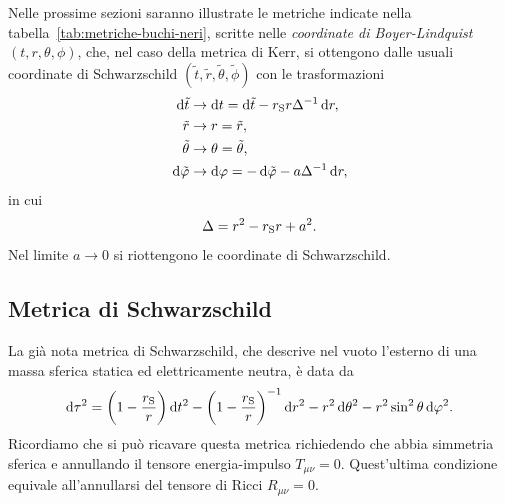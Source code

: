 Nelle prossime sezioni saranno illustrate le metriche indicate nella
tabella~\ref{tab:metriche-buchi-neri}, scritte nelle \emph{coordinate di
  Boyer-Lindquist} \((t, r, \theta,
\phi)\), che, nel caso della metrica di Kerr, si ottengono dalle usuali
coordinate di Schwarzschild \((\tilde{t}, \tilde{r}, \tilde{\theta},
\tilde{\phi})\) con le
trasformazioni~\parencites{1967JMP.....8..265B}{2007arXiv0706.0622V}
\begin{subequations}
  \begin{align}
    \dd\tilde{t}    & \to \dd t   = \dd\tilde{t} - r_{\textup{S}}r\Delta^{-1}
                      \dd r, \\
    \tilde{r}       & \to r       = \tilde{r},                           \\
    \tilde{\theta}  & \to \theta  = \tilde{\theta},                      \\
    \dd\tilde{\phi} & \to \dd\phi = -\dd\tilde{\phi} - a\Delta^{-1} \dd r,
  \end{align}
\end{subequations}
in cui
\begin{equation}
  \Delta = r^{2} - r_{\textup{S}}r + a^{2}.
\end{equation}
Nel limite \(a\to 0\) si riottengono le coordinate di Schwarzschild.

\subsection{Metrica di Schwarzschild}
\label{sec:metrica-schwarzschild-bh}

La già nota metrica di Schwarzschild, che descrive nel vuoto l'esterno di una
massa sferica statica ed elettricamente neutra, è data da
\begin{equation}
  \label{eq:metrica-schwarzschild-bh}
  \mathop{}\!\mathrm{d}\tau^{2} = \bigg(1 - \frac{r_{\textup{S}}}{r} \bigg) \mathop{}\!\mathrm{d} t^{2} - \bigg(1 -
  \frac{r_{\textup{S}}}{r}\bigg)^{-1}\mathop{}\!\mathrm{d} r^{2} - r^{2}\mathop{}\!\mathrm{d}\theta^{2} -
  r^{2}\sin^{2}\theta \mathop{}\!\mathrm{d}\varphi^{2}.
\end{equation}
Ricordiamo che si può ricavare questa metrica richiedendo che abbia simmetria
sferica e annullando il tensore energia-impulso \(T_{\mu\nu} = 0\).
Quest'ultima condizione equivale all'annullarsi del tensore di Ricci
\(R_{\mu\nu} = 0\).

